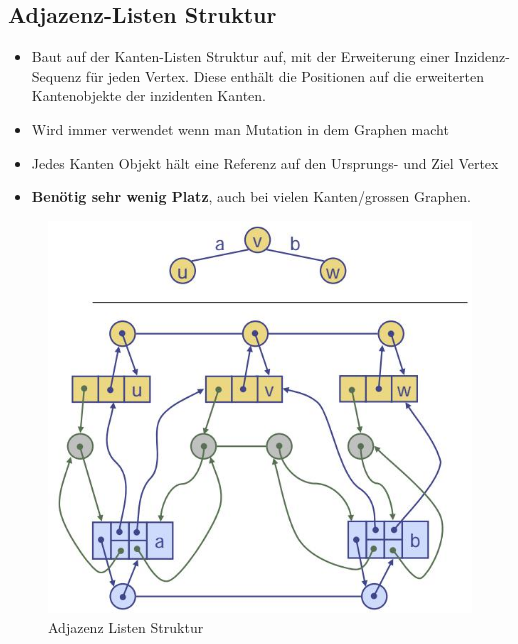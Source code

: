 \subsection{Adjazenz-Listen Struktur}
\begin{itemize}
	\item Baut auf der Kanten-Listen Struktur auf, mit der Erweiterung einer Inzidenz-Sequenz für jeden Vertex. Diese enthält die Positionen auf die erweiterten Kantenobjekte der inzidenten Kanten.
	\item Wird immer verwendet wenn man Mutation in dem Graphen macht
	\item Jedes Kanten Objekt hält eine Referenz auf den Ursprungs- und Ziel Vertex
	\item \textbf{Benötig sehr wenig Platz}, auch bei vielen Kanten/grossen Graphen.
\end{itemize}
\begin{figure}[h!]
\centering
\includegraphics[width=0.5\linewidth]{images/graph_adjazenz_listen}
\caption{Adjazenz Listen Struktur}
\label{fig:graphadjazenzlisten}
\end{figure}

